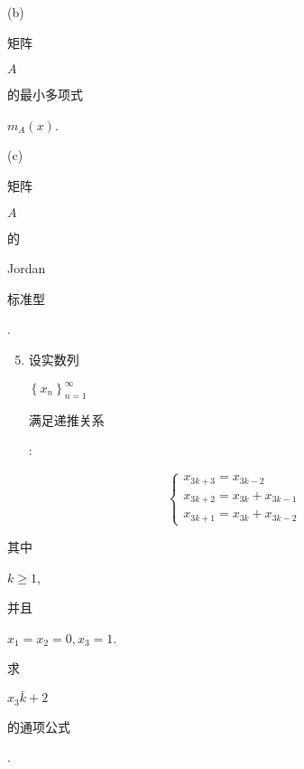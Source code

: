 \documentclass[10pt]{article}
\begin{document}
(b) \begin{CJK}{UTF8}{mj}矩阵\end{CJK} $A$ \begin{CJK}{UTF8}{mj}的最小多项式\end{CJK} $m_{A}(x)$.

(c) \begin{CJK}{UTF8}{mj}矩阵\end{CJK} $A$ \begin{CJK}{UTF8}{mj}的\end{CJK} Jordan \begin{CJK}{UTF8}{mj}标准型\end{CJK}.

\begin{enumerate}
  \setcounter{enumi}{4}
  \item \begin{CJK}{UTF8}{mj}设实数列\end{CJK} $\left\{x_{n}\right\}_{n=1}^{\infty}$ \begin{CJK}{UTF8}{mj}满足递推关系\end{CJK}:
\end{enumerate}
$$
\left\{\begin{array}{l}
x_{3 k+3}=x_{3 k-2} \\
x_{3 k+2}=x_{3 k}+x_{3 k-1} \\
x_{3 k+1}=x_{3 k}+x_{3 k-2}
\end{array}\right.
$$
\begin{CJK}{UTF8}{mj}其中\end{CJK} $k \geq 1$, \begin{CJK}{UTF8}{mj}并且\end{CJK} $x_{1}=x_{2}=0, x_{3}=1$. \begin{CJK}{UTF8}{mj}求\end{CJK} $x_{3} \bar{k}+2$ \begin{CJK}{UTF8}{mj}的通项公式\end{CJK}.
\end{document}
